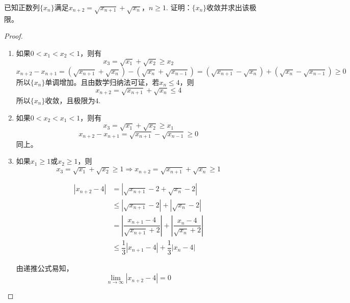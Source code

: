 \begin{proposition}
    
    已知正数列$\{x_n\}$满足$x_{n + 2} = \sqrt{x_{n + 1}} + \sqrt{x_{n}}$，$n \geq 1$. 证明：$\{x_n\}$收敛并求出该极限。

\end{proposition}

\begin{proof}

    \begin{enumerate}

        \item 
            如果$0 < x_1 < x_2 < 1$，则有
            $$x_3 = \sqrt{x_1} + \sqrt{x_2} \geq x_2$$
            $$x_{n + 2} - x_{n + 1} = (\sqrt{x_{n + 1}} + \sqrt{x_{n}}) - (\sqrt{x_{n}} + \sqrt{x_{n - 1}}) = (\sqrt{x_{n + 1}} - \sqrt{x_{n}}) + (\sqrt{x_{n}} - \sqrt{x_{n - 1}}) \geq 0$$
            所以$\{x_n\}$单调增加。且由数学归纳法可证，若$x_n \leq 4$，则
            $$x_{n + 2} = \sqrt{x_{n + 1}} + \sqrt{x_{n}} \leq 4$$
            所以$\{x_n\}$收敛，且极限为$4$.

        \item 
            如果$0 < x_2 < x_1 < 1$，则有
            $$x_3 = \sqrt{x_1} + \sqrt{x_2} \geq x_1$$
            $$x_{n + 2} - x_{n + 1} = \sqrt{x_{n + 1}} - \sqrt{x_{n - 1}} \geq 0$$
            同上。

        \item 
            如果$x_1 \geq 1$或$x_2 \geq 1$，则
            $$x_3 = \sqrt{x_1} + \sqrt{x_2} \geq 1 \Longrightarrow x_{n + 2} = \sqrt{x_{n + 1}} + \sqrt{x_{n}} \geq 1$$
            
            \begin{align*}
                |x_{n + 2} - 4| & = |\sqrt{x_{n + 1}} - 2 + \sqrt{x_{n}} - 2| \\
                & \leq |\sqrt{x_{n + 1}} - 2| + |\sqrt{x_{n}} - 2| \\
                & = \left| \dfrac{x_{n + 1} - 4}{\sqrt{x_{n + 1}} + 2} \right| + \left| \dfrac{x_{n} - 4}{\sqrt{x_{n}} + 2} \right| \\
                & \leq \dfrac{1}{3} |x_{n + 1} - 4| + \dfrac{1}{3}|x_n - 4| 
            \end{align*}

            由递推公式易知，
            $$\lim\limits_{n \to \infty}{|x_{n + 2} - 4|} = 0$$

    \end{enumerate}

\end{proof}

